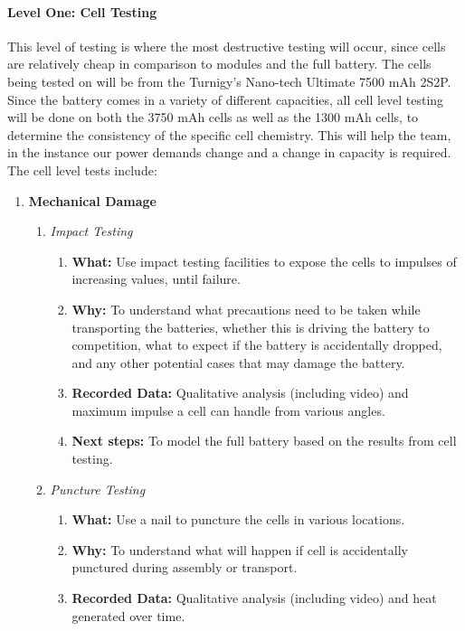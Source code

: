 \documentclass[main.tex]{subfiles}
\begin{document}
    \paragraph{Level One: Cell Testing}
    This level of testing is where the most destructive testing will occur, since cells are relatively cheap in comparison to modules and the full battery. The cells being tested on will be from the Turnigy’s Nano-tech Ultimate  7500 mAh 2S2P. Since the battery comes in a variety of different capacities, all cell level testing will be done on both the 3750 mAh cells as well as the 1300 mAh cells, to determine the consistency of the specific cell chemistry. This will help the team, in the instance our power demands change and a change in capacity is required. The cell level tests include:
    \begin{enumerate}
        \item \textbf{Mechanical Damage}
        \begin{enumerate}
            \item \textit{Impact Testing}
            \begin{enumerate}
                \item \textbf{What: }Use impact testing facilities to expose the cells to impulses of increasing values, until failure.
                \item \textbf{Why: }To understand what precautions need to be taken while transporting the batteries, whether this is driving the battery to competition, what to expect if the battery is accidentally dropped, and any other potential cases that may damage the battery.
                \item \textbf{Recorded Data: }Qualitative analysis (including video) and maximum impulse a cell can handle from various angles.
                \item \textbf{Next steps: }To model the full battery based on the results from cell testing.
            \end{enumerate}
            \item \textit{Puncture Testing}
            \begin{enumerate}
                \item \textbf{What: }Use a nail to puncture the cells in various locations.
                \item \textbf{Why: }To understand what will happen if cell is accidentally punctured during assembly or transport.
                \item \textbf{Recorded Data: }Qualitative analysis (including video) and heat generated over time.

\end{enumerate}
\end{enumerate}
\end{enumerate}
\end{document}
